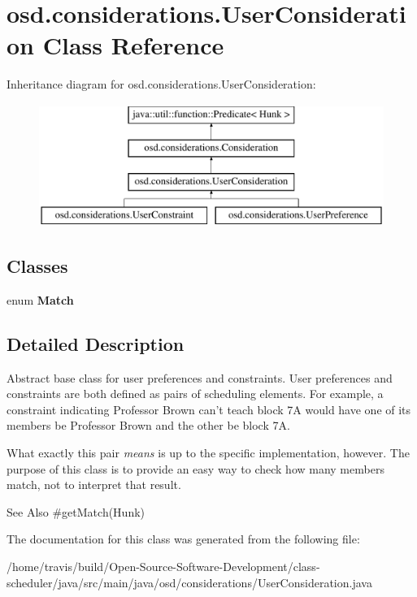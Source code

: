 \hypertarget{classosd_1_1considerations_1_1_user_consideration}{\section{osd.\-considerations.\-User\-Consideration Class Reference}
\label{classosd_1_1considerations_1_1_user_consideration}
}
Inheritance diagram for osd.\-considerations.\-User\-Consideration\-:\begin{figure}[H]
\begin{center}
\leavevmode
\includegraphics[height=4.000000cm]{classosd_1_1considerations_1_1_user_consideration}
\end{center}
\end{figure}
\subsection*{Classes}
\begin{DoxyCompactItemize}
\item 
enum {\bfseries Match}
\end{DoxyCompactItemize}


\subsection{Detailed Description}
Abstract base class for user preferences and constraints. User preferences and constraints are both defined as pairs of scheduling elements. For example, a constraint indicating Professor Brown can't teach block 7\-A would have one of its members be Professor Brown and the other be block 7\-A. 

What exactly this pair {\itshape means} is up to the specific implementation, however. The purpose of this class is to provide an easy way to check how many members match, not to interpret that result.

\begin{DoxySeeAlso}{See Also}
\#get\-Match(\-Hunk) 
\end{DoxySeeAlso}


The documentation for this class was generated from the following file\-:\begin{DoxyCompactItemize}
\item 
/home/travis/build/\-Open-\/\-Source-\/\-Software-\/\-Development/class-\/scheduler/java/src/main/java/osd/considerations/User\-Consideration.\-java\end{DoxyCompactItemize}
